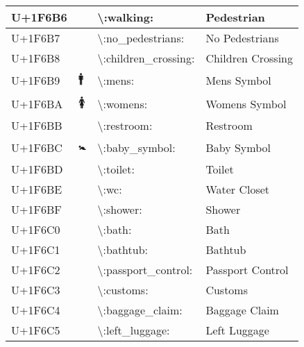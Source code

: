 \begin{table}[h]
\begin{tabulary}{\linewidth}{|L|L|L|L|}
\hline
U+1F6B6 & 🚶 & {\textbackslash}:walking: & Pedestrian \\
\hline
U+1F6B7 & 🚷 & {\textbackslash}:no\_pedestrians: & No Pedestrians \\
\hline
U+1F6B8 & 🚸 & {\textbackslash}:children\_crossing: & Children Crossing \\
\hline
U+1F6B9 & 🚹 & {\textbackslash}:mens: & Mens Symbol \\
\hline
U+1F6BA & 🚺 & {\textbackslash}:womens: & Womens Symbol \\
\hline
U+1F6BB & 🚻 & {\textbackslash}:restroom: & Restroom \\
\hline
U+1F6BC & 🚼 & {\textbackslash}:baby\_symbol: & Baby Symbol \\
\hline
U+1F6BD & 🚽 & {\textbackslash}:toilet: & Toilet \\
\hline
U+1F6BE & 🚾 & {\textbackslash}:wc: & Water Closet \\
\hline
U+1F6BF & 🚿 & {\textbackslash}:shower: & Shower \\
\hline
U+1F6C0 & 🛀 & {\textbackslash}:bath: & Bath \\
\hline
U+1F6C1 & 🛁 & {\textbackslash}:bathtub: & Bathtub \\
\hline
U+1F6C2 & 🛂 & {\textbackslash}:passport\_control: & Passport Control \\
\hline
U+1F6C3 & 🛃 & {\textbackslash}:customs: & Customs \\
\hline
U+1F6C4 & 🛄 & {\textbackslash}:baggage\_claim: & Baggage Claim \\
\hline
U+1F6C5 & 🛅 & {\textbackslash}:left\_luggage: & Left Luggage \\
\hline
\end{tabulary}

\end{table}
